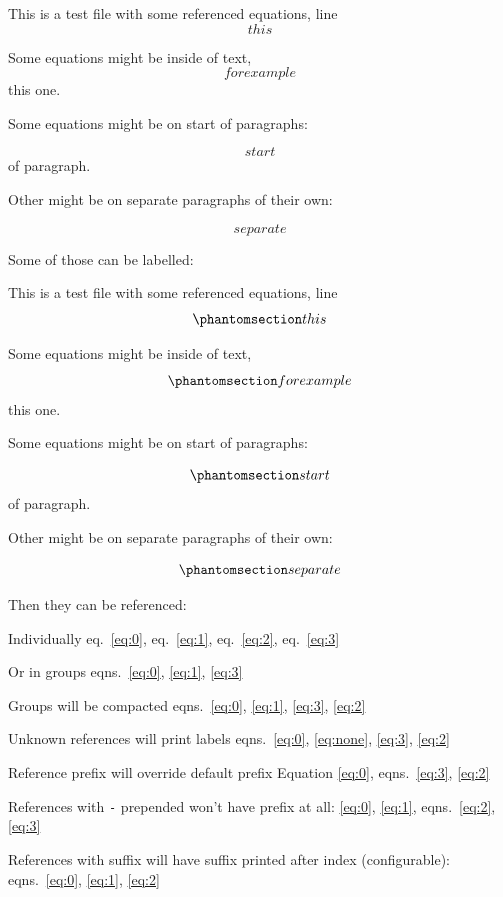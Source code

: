 This is a test file with some referenced equations, line \[this\]

Some equations might be inside of text, \[for example\] this one.

Some equations might be on start of paragraphs:

\[start\] of paragraph.

Other might be on separate paragraphs of their own:

\[separate\]

Some of those can be labelled:

This is a test file with some referenced equations, line
\begin{equation}\protect\phantomsection\label{eq:0}{this}\end{equation}

Some equations might be inside of text,
\begin{equation}\protect\phantomsection\label{eq:1}{for example}\end{equation}
this one.

Some equations might be on start of paragraphs:

\begin{equation}\protect\phantomsection\label{eq:2}{start}\end{equation}
of paragraph.

Other might be on separate paragraphs of their own:

\begin{equation}\protect\phantomsection\label{eq:3}{separate}\end{equation}

Then they can be referenced:

Individually eq.~\ref{eq:0}, eq.~\ref{eq:1}, eq.~\ref{eq:2},
eq.~\ref{eq:3}

Or in groups eqns.~\ref{eq:0}, \ref{eq:1}, \ref{eq:3}

Groups will be compacted
eqns.~\ref{eq:0}, \ref{eq:1}, \ref{eq:3}, \ref{eq:2}

Unknown references will print labels
eqns.~\ref{eq:0}, \ref{eq:none}, \ref{eq:3}, \ref{eq:2}

Reference prefix will override default prefix Equation \ref{eq:0},
eqns.~\ref{eq:3}, \ref{eq:2}

References with \texttt{-} prepended won't have prefix at all:
\ref{eq:0}, \ref{eq:1}, eqns.~\ref{eq:2}, \ref{eq:3}

References with suffix will have suffix printed after index
(configurable): eqns.~\ref{eq:0}, \ref{eq:1}, \ref{eq:2}
